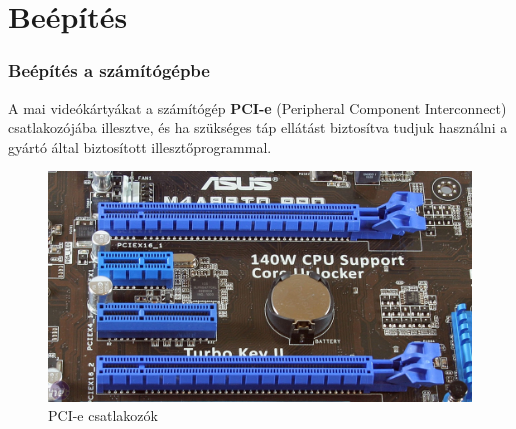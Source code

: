\documentclass[tikz,border=10pt]{beamer}
\begin{document}
\section{Beépítés}
\begin{frame}
\frametitle{Beépítés a számítógépbe}
\transwipe[direction=90]
A mai videókártyákat a számítógép \textbf{PCI-e} (Peripheral Component Interconnect) csatlakozójába illesztve, és ha szükséges táp ellátást biztosítva tudjuk használni a gyártó által biztosított illesztőprogrammal.

\begin{figure}
\centering
\includegraphics[scale=.09]{media/pci.jpg}
\caption{PCI-e csatlakozók}
\end{figure}
\end{frame}
\end{document}
